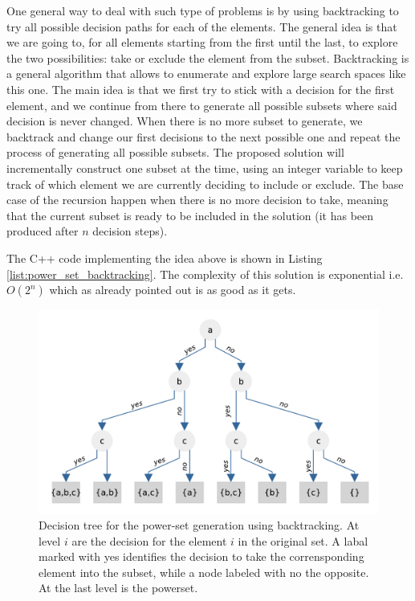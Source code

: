 One general way to deal with such type of problems is by using backtracking to try all possible
decision paths for each of the elements. The general idea is that we are going to, for all elements
starting from the first until the last, to explore the two possibilities: take or exclude the
element from the subset. Backtracking is a general algorithm that allows to enumerate and explore
large search spaces like this one. The main idea is that we first try to stick with a decision for
the first element, and we continue from there to generate all possible subsets where said decision
is never changed. When there is no more subset to generate, we backtrack and change our first
decisions to the next possible one and repeat the process of generating all possible subsets.
The proposed solution will incrementally construct one subset at the time, using an integer variable
to keep track of which element we are currently
deciding to include or exclude. The base case of the recursion happen when there is no more decision
to take, meaning that the current subset is ready to be included in the solution (it has been
produced after $n$ decision steps).

The C++ code implementing the idea above is shown in Listing \ref{list:power_set_backtracking}. The
complexity of this solution is exponential i.e. $O(2^n)$ which as already pointed out is as good as
it gets.

\begin{minipage}{\linewidth}
	
\end{minipage}

\begin{figure}
	\centering
	\includegraphics[width=\textwidth]{sources/power_set/images/tree}
	\caption[Decision tree for the power-set generation using backtracking.]{Decision tree for the power-set generation using backtracking. At level $i$ are the decision for the element $i$ in the original set. A labal marked with yes identifies the decision to take the corrensponding element into the subset, while a node labeled with no the opposite. At the last level is the powerset.}
	\label{ref:power_set_decision_trees}
\end{figure}

